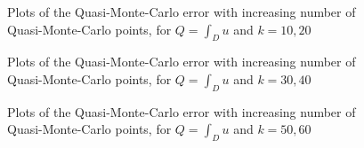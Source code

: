 \begin{figure}[h]
    \centering
  \begin{subfigure}{0.8\textwidth}

  \end{subfigure}
    \begin{subfigure}{0.8\textwidth}

    \end{subfigure}
\caption{Plots of the Quasi-Monte-Carlo error with increasing number of Quasi-Monte-Carlo points, for $Q=\int_D u$ and $k=10,20$ \label{fig:qmcintegral1020}}
\end{figure}
\begin{figure}[h]
    \centering
  \begin{subfigure}{0.8\textwidth}

  \end{subfigure}
    \begin{subfigure}{0.8\textwidth}

    \end{subfigure}
\caption{Plots of the Quasi-Monte-Carlo error with increasing number of Quasi-Monte-Carlo points, for $Q=\int_D u$ and $k=30,40$ \label{fig:qmcintegral3040}}
\end{figure}
\begin{figure}[h]
    \centering
  \begin{subfigure}{0.8\textwidth}

  \end{subfigure}
    \begin{subfigure}{0.8\textwidth}

    \end{subfigure}
\caption{Plots of the Quasi-Monte-Carlo error with increasing number of Quasi-Monte-Carlo points, for $Q=\int_D u$ and $k=50,60$ \label{fig:qmcintegral5060}}
\end{figure}


